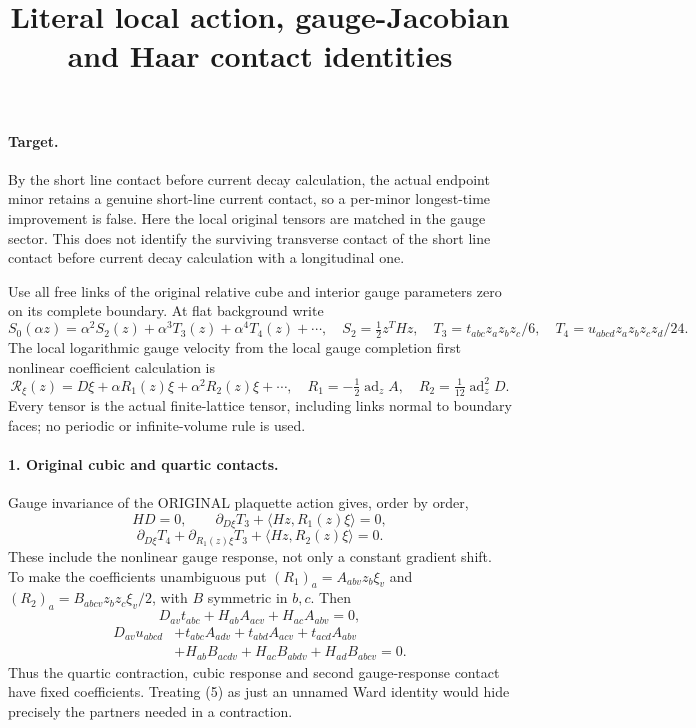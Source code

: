 \documentclass[11pt]{article}
\title{Literal local action, gauge-Jacobian and Haar contact identities}\author{}\date{}
\begin{document}
\maketitle
\paragraph{Target.}
By the short line contact before current decay calculation, the actual endpoint minor retains a genuine
short-line current contact, so a per-minor longest-time improvement is
false. Here the local original tensors are matched in the gauge sector.
This does not identify the surviving transverse contact of the short line contact before current decay calculation with a
longitudinal one.

Use all free links of the original relative cube and interior gauge
parameters zero on its complete boundary. At flat background write
\[
 S_0(\alpha z)=\alpha^2 S_2(z)+\alpha^3T_3(z)+\alpha^4T_4(z)+\cdots,
 \quad S_2=\tfrac12z^THz,\quad
 T_3=t_{abc}z_az_bz_c/6,\quad T_4=u_{abcd}z_az_bz_cz_d/24.
\]
The local logarithmic gauge velocity from the local gauge completion first nonlinear coefficient calculation is
\[
 \mathcal R_\xi(z)=D\xi+\alpha R_1(z)\xi+\alpha^2R_2(z)\xi+\cdots,
 \quad R_1=-\tfrac12\operatorname{ad}_z A,\quad
 R_2=\tfrac1{12}\operatorname{ad}_z^2D.                           \tag{1}
\]
Every tensor is the actual finite-lattice tensor, including links
normal to boundary faces; no periodic or infinite-volume rule is used.

\paragraph{1. Original cubic and quartic contacts.}
Gauge invariance of the ORIGINAL plaquette action gives, order by order,
\[
 HD=0,\qquad
 \partial_{D\xi}T_3+\langle Hz,R_1(z)\xi\rangle=0,                 \tag{2}
\]
\[
 \boxed{\partial_{D\xi}T_4+
       \partial_{R_1(z)\xi}T_3+\langle Hz,R_2(z)\xi\rangle=0.}    \tag{3}
\]
These include the nonlinear gauge response, not only a constant
gradient shift. To make the coefficients unambiguous put
$(R_1)_a=A_{abv}z_b\xi_v$ and
$(R_2)_a=B_{abcv}z_bz_c\xi_v/2$, with $B$ symmetric in $b,c$.
Then
\[
 D_{av}t_{abc}+H_{ab}A_{acv}+H_{ac}A_{abv}=0,                    \tag{4}
\]
\[
 \begin{split}
 D_{av}u_{abcd}
 &+t_{abc}A_{adv}+t_{abd}A_{acv}+t_{acd}A_{abv}\\
 &+H_{ab}B_{acdv}+H_{ac}B_{abdv}+H_{ad}B_{abcv}=0.               \end{split}\tag{5}
\]
Thus the quartic contraction, cubic response and second gauge-response
contact have fixed coefficients. Treating (5) as just an unnamed Ward
identity would hide precisely the partners needed in a contraction.
\end{document}
